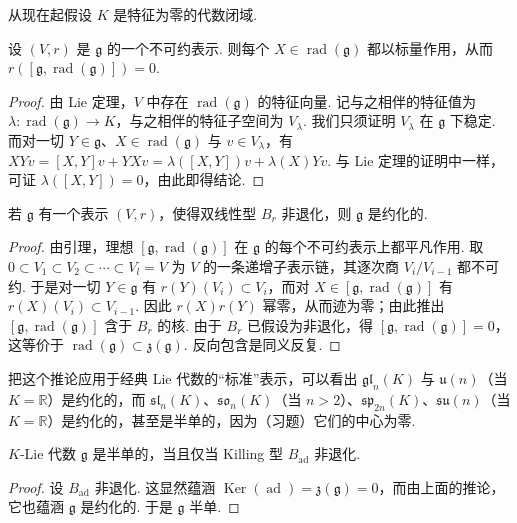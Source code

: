\begin{numpara}\label{np:ssl-2-5-2}
从现在起假设 $K$ 是特征为零的代数闭域.
\begin{lemma*}
设 $(V,r)$ 是 $\mathfrak g$ 的一个不可约表示. 则每个 $X\in\operatorname{rad}(\mathfrak g)$ 都以标量作用，从而 $r([\mathfrak g,\operatorname{rad}(\mathfrak g)])=0$.
\end{lemma*}
\begin{proof}
由 Lie 定理，$V$ 中存在 $\operatorname{rad}(\mathfrak g)$ 的特征向量. 记与之相伴的特征值为 $\lambda\colon\operatorname{rad}(\mathfrak g)\longrightarrow K$，与之相伴的特征子空间为 $V_{\lambda}$. 我们只须证明 $V_{\lambda}$ 在 $\mathfrak g$ 下稳定. 而对一切 $Y\in\mathfrak g$、$X\in\operatorname{rad}(\mathfrak g)$ 与 $v\in V_{\lambda}$，有 $XYv=[X,Y]v+YXv=\lambda([X,Y])v+\lambda(X)Yv$. 与 Lie 定理的证明中一样，可证 $\lambda([X,Y])=0$，由此即得结论.
\end{proof}
\begin{corollary*}
若 $\mathfrak g$ 有一个表示 $(V,r)$，使得双线性型 $B_r$ 非退化，则 $\mathfrak g$ 是约化的.
\end{corollary*}
\begin{proof}
由引理，理想 $[\mathfrak g,\operatorname{rad}(\mathfrak g)]$ 在 $\mathfrak g$ 的每个不可约表示上都平凡作用. 取 $0\subset V_1\subset V_2\subset\cdots\subset V_l=V$ 为 $V$ 的一条递增子表示链，其逐次商 $V_i/V_{i-1}$ 都不可约. 于是对一切 $Y\in\mathfrak g$ 有 $r(Y)(V_i)\subset V_i$，而对 $X\in[\mathfrak g,\operatorname{rad}(\mathfrak g)]$ 有 $r(X)(V_i)\subset V_{i-1}$. 因此 $r(X)r(Y)$ 幂零，从而迹为零；由此推出 $[\mathfrak g,\operatorname{rad}(\mathfrak g)]$ 含于 $B_r$ 的核. 由于 $B_r$ 已假设为非退化，得 $[\mathfrak g,\operatorname{rad}(\mathfrak g)]=0$，这等价于 $\operatorname{rad}(\mathfrak g)\subset\mathfrak z(\mathfrak g)$. 反向包含是同义反复.
\end{proof}
\begin{example*}
把这个推论应用于经典 Lie 代数的``标准''表示，可以看出 $\mathfrak{gl}_n(K)$ 与 $\mathfrak u(n)$（当 $K=\mathbb{R}$）是约化的，而 $\mathfrak{sl}_n(K)$、$\mathfrak{so}_n(K)$（当 $n>2$）、$\mathfrak{sp}_{2n}(K)$、$\mathfrak{su}(n)$（当 $K=\mathbb{R}$）是约化的，甚至是半单的，因为（习题）它们的中心为零.
\end{example*}
\begin{theorem*}[Cartan]
$K$-Lie 代数 $\mathfrak g$ 是半单的，当且仅当 Killing 型 $B_{\operatorname{ad}}$ 非退化.
\end{theorem*}
\begin{proof}
设 $B_{\operatorname{ad}}$ 非退化. 这显然蕴涵 $\operatorname{Ker}(\operatorname{ad})=\mathfrak z(\mathfrak g)=0$，而由上面的推论，它也蕴涵 $\mathfrak g$ 是约化的. 于是 $\mathfrak g$ 半单.


\end{proof}
\end{numpara}
